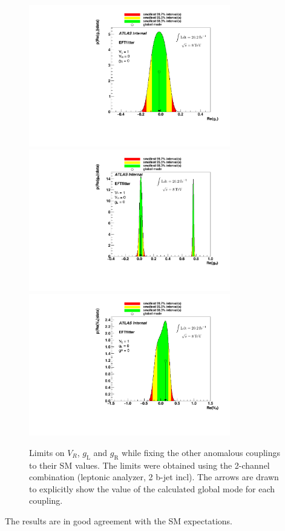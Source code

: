 \begin{figure}[!h]
\begin{center}
		\includegraphics[height=62mm]{chapters/whel/figures/anomalousWtb/new_lep2incl/gL} \\
		\includegraphics[height=62mm]{chapters/whel/figures/anomalousWtb/new_lep2incl/gR}
		\includegraphics[height=62mm]{chapters/whel/figures/anomalousWtb/new_lep2incl/VR} \\
	\caption{Limits on $V_R$, $g_{\text{L}}$ and $g_{\text{R}}$ while fixing the other anomalous couplings to their SM values. The limits were obtained using the 2-channel combination (leptonic analyzer, 2 b-jet incl). The arrows are drawn to explicitly show the value of the calculated global mode for each coupling.}
	\label{fig:anomalousLimits_1d_2ch}
\end{center}
\end{figure}

The results are in good agreement with the SM expectations.
